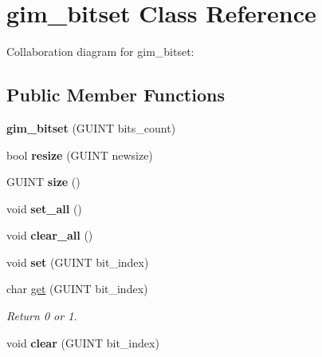 \hypertarget{classgim__bitset}{\section{gim\+\_\+bitset Class Reference}
\label{classgim__bitset}
}


Collaboration diagram for gim\+\_\+bitset\+:
\subsection*{Public Member Functions}
\begin{DoxyCompactItemize}
\item 
\hypertarget{classgim__bitset_aeccc093df2297681fe15ac8a834fb1b9}{{\bfseries gim\+\_\+bitset} (G\+U\+I\+N\+T bits\+\_\+count)}\label{classgim__bitset_aeccc093df2297681fe15ac8a834fb1b9}

\item 
\hypertarget{classgim__bitset_a0e82a6b28b87437e79c15525b55c4f8c}{bool {\bfseries resize} (G\+U\+I\+N\+T newsize)}\label{classgim__bitset_a0e82a6b28b87437e79c15525b55c4f8c}

\item 
\hypertarget{classgim__bitset_aa07758d41967a1da50ae8f7cb04d0cc3}{G\+U\+I\+N\+T {\bfseries size} ()}\label{classgim__bitset_aa07758d41967a1da50ae8f7cb04d0cc3}

\item 
\hypertarget{classgim__bitset_a903c948276d62b7f8cbb49b369b98ab0}{void {\bfseries set\+\_\+all} ()}\label{classgim__bitset_a903c948276d62b7f8cbb49b369b98ab0}

\item 
\hypertarget{classgim__bitset_a983f1435bc37a33c9e2a259a14c29cf6}{void {\bfseries clear\+\_\+all} ()}\label{classgim__bitset_a983f1435bc37a33c9e2a259a14c29cf6}

\item 
\hypertarget{classgim__bitset_a8af47716e1519bf587bad9436040c99e}{void {\bfseries set} (G\+U\+I\+N\+T bit\+\_\+index)}\label{classgim__bitset_a8af47716e1519bf587bad9436040c99e}

\item 
\hypertarget{classgim__bitset_a62e08efb3b9c5982860ee9ebec3f31a5}{char \hyperlink{classgim__bitset_a62e08efb3b9c5982860ee9ebec3f31a5}{get} (G\+U\+I\+N\+T bit\+\_\+index)}\label{classgim__bitset_a62e08efb3b9c5982860ee9ebec3f31a5}

\begin{DoxyCompactList}\small\item\em Return 0 or 1. \end{DoxyCompactList}\item 
\hypertarget{classgim__bitset_a4a231f6d93a5e6ea21aa1b881399600d}{void {\bfseries clear} (G\+U\+I\+N\+T bit\+\_\+index)}\label{classgim__bitset_a4a231f6d93a5e6ea21aa1b881399600d}

\end{DoxyCompactItemize}
